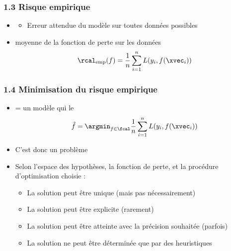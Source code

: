 \begin{frame}
  \frametitle{1.3 Risque empirique}
  \begin{itemize}
  \item {}
    \begin{itemize}
    \item Erreur attendue du modèle sur toutes données possibles 
    \end{itemize}
  \item {} moyenne de la fonction de perte sur les
    données
    \[\rcal_{\text{emp}}(f) = \frac1n \sum_{i=1}^n L(y_i, f(\xvec_i)) \]
  \end{itemize}
\end{frame}


\begin{frame}
  \frametitle{1.4 Minimisation du risque empirique}
  \begin{itemize}
  \item {} =  un modèle  qui  le 
    \[ \hat{f} = \argmin_{f \in \fcal} \frac1n \sum_{i=1}^n L(y_i, f(\xvec_i)) \]
  \item C'est donc un problème 
  \item Selon l'espace des hypothèses, la fonction de perte, et la procédure
    d'optimisation choisie :
    \begin{itemize}
    \item La solution peut être unique (mais pas nécessairement)
    \item La solution peut être explicite (rarement)
    \item La solution peut être atteinte avec la précision souhaitée (parfois)
    \item La solution ne peut être déterminée que par des heuristiques 
    \end{itemize}
  \end{itemize}
\end{frame}

